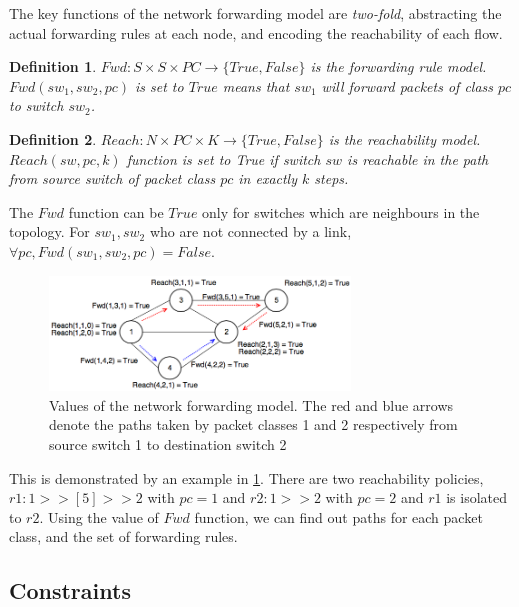 \documentclass[]{sig}
\newtheorem{mydef}{Definition}
\begin{document}
The key functions of the network forwarding model are \emph{two-fold}, abstracting the actual forwarding rules at each node, and encoding the reachability of each flow. 
\begin{mydef}
	$Fwd : S \times S \times PC  \rightarrow \{True,False\}$ is the forwarding rule model. $Fwd(sw_1, sw_2, pc)$ is set to $True$ means that $sw_1$ will forward packets of class $pc$ to switch $sw_2$.
\end{mydef}
\begin{mydef}
	$Reach : N \times PC \times K  \rightarrow \{True,False\}$ is the reachability model. $Reach(sw, pc, k)$ function is set to True if switch $sw$ is reachable in the path from source switch of packet class $pc$ in exactly $k$ steps.  
\end{mydef}
The $Fwd$ function can be $True$ only for switches which are neighbours in the topology. For $sw_1, sw_2$ who are not connected by a link, $\forall pc, Fwd(sw_1,sw_2,pc) = False$.
\begin{figure}[H]
	\includegraphics[width=8cm]{topoF.png}
	\caption{Values of the network forwarding model. The red and blue arrows denote the paths taken by packet classes 1 and 2 respectively from source switch 1 to destination switch 2}
	\label{fig:model}
\end{figure}
This is demonstrated by an example in \cref{fig:model}. There are two reachability policies, $r1 : 1 >> [5] >> 2$ with $pc=1$ and $r2 : 1 >> 2$ with $pc=2$ and $r1$ is isolated to $r2$. Using the value of $Fwd$ function, we can find out paths for each packet class, and the set of forwarding rules. 

\subsection{Constraints}
\end{document}
